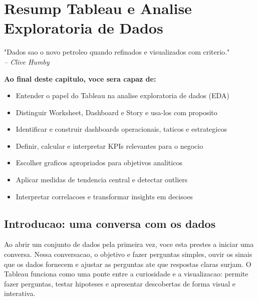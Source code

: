 
\chapter{Resump Tableau e Analise Exploratoria de Dados}
\label{cap:tableau}

\begin{EpigraphBox}
  "Dados sao o novo petroleo quando refinados e visualizados com criterio."\\
  	\textit{-- Clive Humby}
\end{EpigraphBox}

\begin{LearningObjectives}
	\textbf{Ao final deste capitulo, voce sera capaz de:}
\begin{itemize}
  \item Entender o papel do Tableau na analise exploratoria de dados (EDA)
  \item Distinguir Worksheet, Dashboard e Story e usa-los com proposito
  \item Identificar e construir dashboards operacionais, taticos e estrategicos
  \item Definir, calcular e interpretar KPIs relevantes para o negocio
  \item Escolher graficos apropriados para objetivos analiticos
  \item Aplicar medidas de tendencia central e detectar outliers
  \item Interpretar correlacoes e transformar insights em decisoes
\end{itemize}
\end{LearningObjectives}

\section{Introducao: uma conversa com os dados}

Ao abrir um conjunto de dados pela primeira vez, voce esta prestes a iniciar uma conversa. Nessa conversacao, o objetivo e fazer perguntas simples, ouvir os sinais que os dados fornecem e ajustar as perguntas ate que respostas claras surjam. O Tableau funciona como uma ponte entre a curiosidade e a visualizacao: permite fazer perguntas, testar hipoteses e apresentar descobertas de forma visual e interativa.

